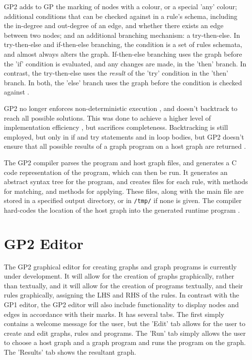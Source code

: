 \documentclass{UoYCSproject}
\begin{document}
GP2 adds to GP the marking of nodes with a colour, or a special 'any' colour; additional conditions that can be checked against in a rule's schema, including the in-degree and out-degree of an edge, and whether there exists an edge between two nodes; and an additional branching mechanism: a try-then-else. In try-then-else and if-then-else branching, the condition is a set of rules schemata, and almost always alters the graph. If-then-else branching uses the graph before the 'if' condition is evaluated, and any changes are made, in the 'then' branch. In contrast, the try-then-else uses the \emph{result} of the 'try' condition in the 'then' branch. In both, the 'else' branch uses the graph before the condition is checked against \cite{gp2_design}.

GP2 no longer enforces non-deterministic execution \cite[p. 15]{gp2_ide}, and doesn't backtrack to reach all possible solutions. This was done to achieve a higher level of implementation efficiency \cite[p. 15]{chris_compiler}, but sacrifices completeness. Backtracking is still employed, but only in if and try statements and in loop bodies, but GP2 doesn't ensure that all possible results of a graph program on a host graph are returned \cite[p. 65]{chris_compiler}.

The GP2 compiler parses the program and host graph files, and generates a C code representation of the program, which can then be run. It generates an abstract syntax tree for the program, and creates files for each rule, with methods for matching, and methods for applying. These files, along with the main file are stored in a specified output directory, or in \texttt{/tmp/} if none is given. The compiler hard-codes the location of the host graph into the generated runtime program \citep{chris_compiler, compiling_gp2}.

\section{GP2 Editor}
The GP2 graphical editor for creating graphs and graph programs is currently under development. It will allow for the creation of graphs graphically, rather than textually, and it will allow for the creation of programs textually, and their rules graphically, assigning the LHS and RHS of the rules. In contrast with the GP1 editor, the GP2 editor will also include functionality to display nodes and edges in accordance with their marks. It has several tabs. The first simply contains a welcome message for the user, but the 'Edit' tab allows for the user to create and edit graphs, rules and programs. The 'Run' tab simply allows the user to choose a host graph and a graph program and runs the program on the graph. The 'Results' tab shows the resultant graph.
\end{document}
